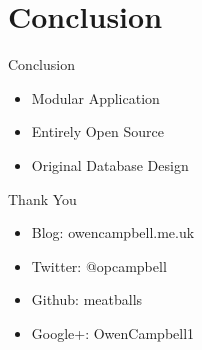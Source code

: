\documentclass{beamer}
\begin{document}
  \section{Conclusion}

  \begin{frame}{Conclusion}
    \begin{itemize}
      \item Modular Application
      \pause
      \item Entirely Open Source
      \pause
      \item Original Database Design
    \end{itemize}
  \end{frame}

  \begin{frame}{Thank You}
    \begin{itemize}
      \item Blog: owencampbell.me.uk
      \item Twitter: @opcampbell
      \item Github: meatballs
      \item Google+: OwenCampbell1
    \end{itemize}
  \end{frame}
\end{document}
